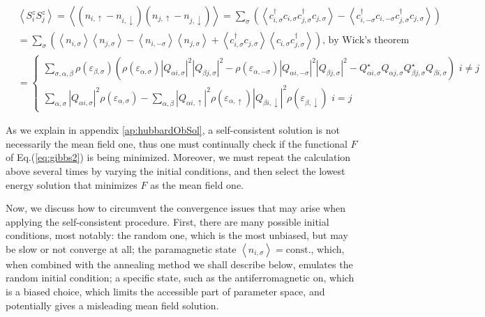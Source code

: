 \begin{equation}
\begin{split}
&\left\langle S_i^z S_j^z \right\rangle = \left\langle ( n_{i,\uparrow} -  n_{i,\downarrow} ) ( n_{j,\uparrow} -  n_{j,\downarrow} )  \right\rangle = \sum_{\sigma} \left( \left\langle c_{i,\sigma}^\dagger c_{i,\sigma} c_{j,\sigma}^\dagger c_{j,\sigma} \right\rangle - \left\langle c_{i,-\sigma}^\dagger c_{i,-\sigma} c_{j,\sigma}^\dagger c_{j,\sigma} \right\rangle \right) \\
&=\sum_{\sigma} \left( \left\langle n_{i,\sigma} \right\rangle \left\langle n_{j,\sigma} \right\rangle - \left\langle n_{i,-\sigma} \right\rangle \left\langle n_{j,\sigma} \right\rangle + \left\langle c_{i,\sigma}^\dagger c_{j,\sigma}  \right\rangle \left\langle c_{i,\sigma} c_{j,\sigma}^\dagger \right\rangle \right) , \, \text{by Wick's theorem} \\
&=
\begin{cases}
\sum_{\sigma, \alpha, \beta} \rho ( \varepsilon_{\beta, \sigma} ) \left( \rho ( \varepsilon_{\alpha, \sigma} ) | Q_{\alpha i, \sigma} |^2 | Q_{\beta j, \sigma} |^2  - \rho ( \varepsilon_{\alpha, -\sigma} ) | Q_{\alpha i, -\sigma} |^2 | Q_{\beta j, \sigma} |^2  - Q_{\alpha i, \sigma}^\star Q_{\alpha j, 
\sigma}  Q_{\beta j, \sigma}^\star Q_{\beta i, 
\sigma} \right) \,\, i \neq j \\
\sum_{\alpha,\sigma} | Q_{\alpha i, \sigma} |^2 \rho (\varepsilon_{\alpha, \sigma}) - \sum_{\alpha,\beta} | Q_{\alpha i, \uparrow} |^2 \rho (\varepsilon_{\alpha, \uparrow}) | Q_{\beta i, \downarrow} |^2 \rho (\varepsilon_{\beta, \downarrow}) \,\, i = j
\end{cases}
\end{split}
\end{equation}

As we explain in appendix \ref{ap:hubbardObSol}, a self-consistent solution is not necessarily the mean field one, thus one must continually check if the functional $F$ of Eq.(\ref{eq:gibbs2}) is being minimized.
Moreover, we must repeat the calculation above several times by varying the initial conditions, and then select the lowest energy solution that minimizes $F$ as the mean field one.

Now, we discuss how to circumvent the convergence issues that may arise when applying the self-consistent procedure.
First, there are many possible initial conditions, most notably: the random one, which is the most unbiased, but may be slow or not converge at all; the paramagnetic state $\left\langle n_{i,\sigma} \right\rangle = \text{const.}$, which, when combined with the annealing method we shall describe below, emulates the random initial condition; a specific state, such as the antiferromagnetic on, which is a biased choice, which limits the accessible part of parameter space, and potentially gives a misleading mean field solution.

